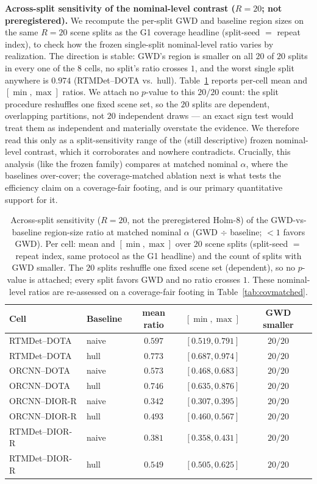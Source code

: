 \documentclass[11pt]{article}
\begin{document}
\textbf{Across-split sensitivity of the nominal-level contrast ($R{=}20$; not preregistered).} We recompute
the per-split GWD and baseline region sizes on the same $R{=}20$ scene splits as the G1 coverage headline
(split-seed $=$ repeat index), to check how the frozen single-split nominal-level ratio varies by
realization. The direction is stable: GWD's region is smaller on all $20$ of $20$ splits in every one
of the $8$ cells, no split's ratio crosses $1$, and the worst single split anywhere is $0.974$
(RTMDet--DOTA vs.\ hull). Table~\ref{tab:r20holm} reports per-cell mean and $[\min,\max]$ ratios.
We attach no $p$-value to this $20/20$ count: the split procedure reshuffles one fixed scene
set, so the $20$ splits are dependent, overlapping partitions, not $20$ independent draws --- an exact sign
test would treat them as independent and materially overstate the evidence. We therefore read this only as a
split-sensitivity range of the (still descriptive) frozen nominal-level contrast, which it corroborates and
nowhere contradicts. Crucially, this analysis (like the frozen family) compares at matched nominal
$\alpha$, where the baselines over-cover; the coverage-matched ablation next is what tests the efficiency
claim on a coverage-fair footing, and is our primary quantitative support for it.

\begin{table}[t]\centering\small
\caption{Across-split sensitivity ($R{=}20$, not the preregistered Holm-8) of the
GWD-vs-baseline region-size ratio at matched nominal $\alpha$ (GWD $\div$ baseline; ${<}1$ favors
GWD). Per cell: mean and $[\min,\max]$ over $20$ scene splits (split-seed $=$ repeat index, same protocol as
the G1 headline) and the count of splits with GWD smaller. The $20$ splits reshuffle one fixed scene set
(dependent), so no $p$-value is attached; every split favors GWD and no ratio crosses $1$. These
nominal-level ratios are re-assessed on a coverage-fair footing in Table~\ref{tab:covmatched}.}
\label{tab:r20holm}
\begin{tabular}{llccc}
\toprule
Cell & Baseline & mean ratio & $[\min,\max]$ & GWD smaller \\
\midrule
RTMDet--DOTA   & naive & $0.597$ & $[0.519,0.791]$ & $20/20$ \\
RTMDet--DOTA   & hull  & $0.773$ & $[0.687,0.974]$ & $20/20$ \\
ORCNN--DOTA    & naive & $0.573$ & $[0.468,0.683]$ & $20/20$ \\
ORCNN--DOTA    & hull  & $0.746$ & $[0.635,0.876]$ & $20/20$ \\
ORCNN--DIOR-R  & naive & $0.342$ & $[0.307,0.395]$ & $20/20$ \\
ORCNN--DIOR-R  & hull  & $0.493$ & $[0.460,0.567]$ & $20/20$ \\
RTMDet--DIOR-R & naive & $0.381$ & $[0.358,0.431]$ & $20/20$ \\
RTMDet--DIOR-R & hull  & $0.549$ & $[0.505,0.625]$ & $20/20$ \\
\bottomrule
\end{tabular}
\end{table}
\end{document}
